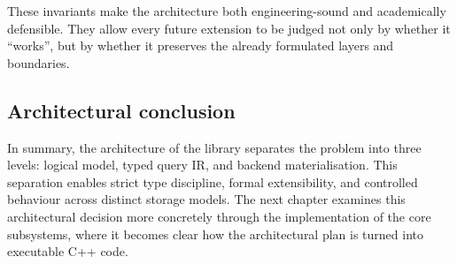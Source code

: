 These invariants make the architecture both engineering-sound and academically defensible. They allow every future extension to be judged not only by whether it ``works'', but by whether it preserves the already formulated layers and boundaries.

\subsection{Architectural conclusion}

In summary, the architecture of the library separates the problem into three levels: logical model, typed query IR, and backend materialisation. This separation enables strict type discipline, formal extensibility, and controlled behaviour across distinct storage models. The next chapter examines this architectural decision more concretely through the implementation of the core subsystems, where it becomes clear how the architectural plan is turned into executable C++ code.
